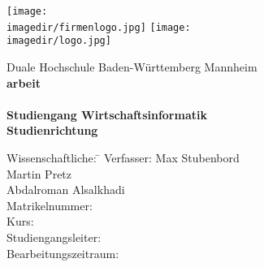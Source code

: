 \begin{titlepage}
	\begin{minipage}{\textwidth}
		\vspace{-2cm}
		\noindent \texttt{[image: \\imagedir/firmenlogo.jpg]} \hfill \texttt{[image: \\imagedir/logo.jpg]}
	\end{minipage}
	\vspace{1em}
	\begin{center}
		{\textsf{\large Duale Hochschule Baden-W\"urttemberg Mannheim}}\\[4em]
		{\textsf{\textbf{\large{\DieArtDerArbeit}arbeit}}}\\[6mm]
		{\textsf{\textbf{\Large{}\DerTitelDerArbeit}}} \\[1.5cm]
		{\textsf{\textbf{\large{}Studiengang Wirtschaftsinformatik}}\\[6mm]
		\textsf{\textbf{Studienrichtung \DieStudienrichtung}}}\vspace{10em}

		\begin{minipage}{\textwidth}
			\begin{tabbing}
				Wissenschaftliche: \hspace{0.85cm}\=\kill
				Verfasser: \> Max Stubenbord \\ \>  Martin Pretz \\ \> Abdalroman Alsalkhadi\\[1.5mm]
				Matrikelnummer: \> \DieMatrikelnummer \\[1.5mm]
				Kurs: \> \DieKursbezeichnung \\[1.5mm]
				Studiengangsleiter: \> \DerStudiengangsleiter \\[1.5mm]
				Bearbeitungszeitraum: \> \DerBearbeitungszeitraum\\[1.5mm]
			\end{tabbing}
		\end{minipage}
	\end{center}
\end{titlepage}
